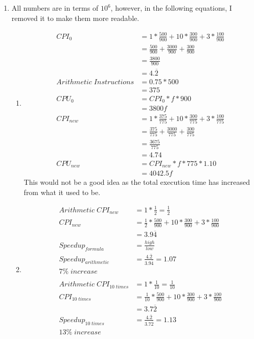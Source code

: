 \documentclass[11pt,letterpaper]{article}
\newcommand\setProbNum[1]{\setcounter{enumi}{\numexpr#1-1\relax}}
\begin{document}
\begin{enumerate}
	\setProbNum{41}
	\item
		All numbers are in terms of $10^6$, however, in the following equations, I removed it to make them more readable.
		\begin{enumerate}[label=(\arabic*)]
			\setProbNum{1}
			\item
				\begin{align*}
					CPI_{0} &= 1* \frac{500}{900} + 10 * \frac{300}{900} + 3 * \frac{100}{900}\\
					&= \frac{500}{900} + \frac{3000}{900} + \frac{300}{900}\\
					&= \frac{3800}{900}\\
					&= 4.\overline{2}\\
					Arithmetic\; Instructions &= 0.75 * 500\\
					&= 375\\
					CPU_{0} &= CPI_{0} * f * 900\\
					&= 3800f\\
					CPI_{new} &= 1* \frac{375}{775} + 10 * \frac{300}{775} + 3 * \frac{100}{775}\\
					&= \frac{375}{775} + \frac{3000}{775} + \frac{300}{775}\\
					&= \frac{3675}{775}\\
					&= 4.74\\
					CPU_{new} &= CPI_{new} * f * 775 * 1.10\\
					&= 4042.5f
				\end{align*}
				This would not be a good idea as the total execution time has increased from what it used to be.
			
			\setProbNum{2}
			\item
				\begin{align*}
					Arithmetic\; CPI_{new} &= 1*\frac{1}{2} = \frac{1}{2}\\
					CPI_{new} &= \frac{1}{2} * \frac{500}{900} + 10 * \frac{300}{900} + 3 * \frac{100}{900}\\
					&= 3.9\overline{4}\\
					Speedup_{formula} &= \frac{high}{low}\\
					Speedup_{arithmetic} &= \frac{4.\overline{2}}{3.9\overline{4}} = 1.07\\
					7\% \;increase\\\\
					Arithmetic\; CPI_{10\; times} &= 1* \frac{1}{10} = \frac{1}{10}\\
					CPI_{10\; times} &= \frac{1}{10} * \frac{500}{900} + 10 * \frac{300}{900} + 3 * \frac{100}{900}\\
					&= 3.7\overline{2}\\
					Speedup_{10\; times} &= \frac{4.\overline{2}}{3.7\overline{2}} = 1.13\\
					13\% \;increase
				\end{align*}
		\end{enumerate}
	

\end{enumerate}
\end{document}
